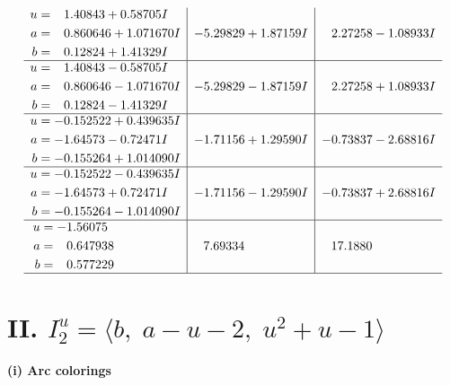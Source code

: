 \documentclass[1p]{elsarticle_modified}
\theoremstyle{definition}
\begin{document}
$$\begin{array}{c|c|c}
\begin{aligned}
u &= \phantom{-}1.40843 + 0.58705 I \\
a &= \phantom{-}0.860646 + 1.071670 I \\
b &= \phantom{-}0.12824 + 1.41329 I\end{aligned}
 & -5.29829 + 1.87159 I & \phantom{-}2.27258 - 1.08933 I \\ \hline\begin{aligned}
u &= \phantom{-}1.40843 - 0.58705 I \\
a &= \phantom{-}0.860646 - 1.071670 I \\
b &= \phantom{-}0.12824 - 1.41329 I\end{aligned}
 & -5.29829 - 1.87159 I & \phantom{-}2.27258 + 1.08933 I \\ \hline\begin{aligned}
u &= -0.152522 + 0.439635 I \\
a &= -1.64573 - 0.72471 I \\
b &= -0.155264 + 1.014090 I\end{aligned}
 & -1.71156 + 1.29590 I & -0.73837 - 2.68816 I \\ \hline\begin{aligned}
u &= -0.152522 - 0.439635 I \\
a &= -1.64573 + 0.72471 I \\
b &= -0.155264 - 1.014090 I\end{aligned}
 & -1.71156 - 1.29590 I & -0.73837 + 2.68816 I \\ \hline\begin{aligned}
u &= -1.56075\phantom{ +0.000000I} \\
a &= \phantom{-}0.647938\phantom{ +0.000000I} \\
b &= \phantom{-}0.577229\phantom{ +0.000000I}\end{aligned}
 & \phantom{-}7.69334\phantom{ +0.000000I} & \phantom{-}17.1880\phantom{ +0.000000I}\\
 \hline 
 \end{array}$$\newpage\newpage\renewcommand{\arraystretch}{1}
\centering \section*{II. $I^u_{2}= \langle b,\;a- u-2,\;u^2+u-1 \rangle$}
\flushleft \textbf{(i) Arc colorings}\\
\end{document}

